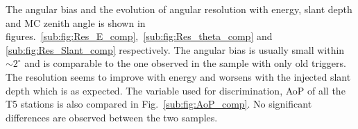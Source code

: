 The angular bias and the evolution of angular resolution with energy, slant depth and MC zenith angle is shown in figures.~\ref{sub:fig:Res_E_comp},~\ref{sub:fig:Res_theta_comp} and \ref{sub:fig:Res_Slant_comp} respectively. The angular bias is usually small within $\sim 2^{\circ}$ and is comparable to the one observed in the sample with only old triggers. The resolution seems to improve with energy and worsens with the injected slant depth which is as expected. The variable used for discrimination, AoP of all the T5 stations is also compared in Fig.~\ref{sub:fig:AoP_comp}. No significant differences are observed between the two samples. 

\begin{figure}[h!]
  \centering
  \hfill

\end{figure}
